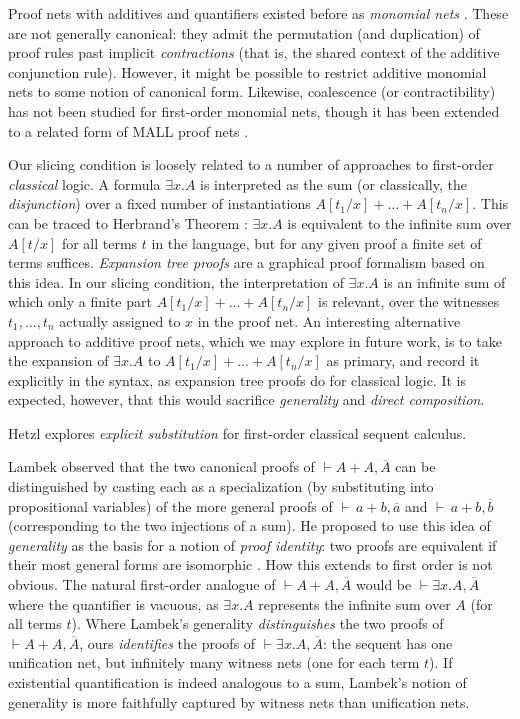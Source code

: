\documentclass[a4paper,UKenglish]{lipics-v2019}
\newcommand\+{+}
\renewcommand\*{\times}
\newcommand\dual[1]{\overline{#1}}
\newcommand\seq[2]{{\vdash}#1,#2}
\begin{document}
Proof nets with additives and quantifiers existed before as \emph{monomial nets} \cite{Girard-1996}. These are not generally canonical: they admit the permutation (and duplication) of proof rules past implicit \emph{contractions} (that is, the shared context of the additive conjunction rule). However, it might be possible to restrict additive monomial nets to some notion of canonical form. Likewise, coalescence (or contractibility) has not been studied for first-order monomial nets, though it has been extended to a related form of MALL proof nets \cite{Maieli-2007}.

Our slicing condition is loosely related to a number of approaches to first-order \emph{classical} logic. A formula $\exists x.A$ is interpreted as the sum (or classically, the \emph{disjunction}) over a fixed number of instantiations $A[t_1/x]\+\dots\+A[t_n/x]$. This can be traced to Herbrand's Theorem \cite{Herbrand-1930}: $\exists x.A$ is equivalent to the infinite sum over $A[t/x]$ for all terms $t$ in the language, but for any given proof a finite set of terms suffices. \emph{Expansion tree proofs} \cite{Miller-1987,Heijltjes-2010} are a graphical proof formalism based on this idea. In our slicing condition, the interpretation of $\exists x.A$ is an infinite sum of which only a finite part $A[t_1/x]\+\dots\+A[t_n/x]$ is relevant, over the witnesses $t_1,\dots,t_n$ actually assigned to $x$ in the proof net. An interesting alternative approach to additive proof nets, which we may explore in future work, is to take the expansion of $\exists x.A$ to $A[t_1/x]\+\dots\+A[t_n/x]$ as primary, and record it explicitly in the syntax, as expansion tree proofs do for classical logic. It is expected, however, that this would sacrifice \emph{generality} and \emph{direct composition}.

Hetzl \cite{Hetzl-2010} explores \emph{explicit substitution} for first-order classical sequent calculus.

Lambek observed that the two canonical proofs of $\seq{A{\+}A}{\dual A}$ can be distinguished by casting each as a specialization (by substituting into propositional variables) of the more general proofs of $\seq{\,a{\+}b}{\dual a}$ and $\seq{\,a{\+}b}{\dual b}$ (corresponding to the two injections of a sum). He proposed to use this idea of \emph{generality} as the basis for a notion of \emph{proof identity}: two proofs are equivalent if their most general forms are isomorphic \cite{Lambek-1968-1972}. How this extends to first order is not obvious. The natural first-order analogue of $\seq{A{\+}A}{\dual A}$ would be $\seq{\exists x.A}{\dual A}$ where the quantifier is vacuous, as $\exists x.A$ represents the infinite sum over $A$ (for all terms $t$). Where Lambek's generality \emph{distinguishes} the two proofs of $\seq{A{\+}A}{\dual A}$, ours \emph{identifies} the proofs of $\seq{\exists x.A}{\dual A}$: the sequent has one unification net, but infinitely many witness nets (one for each term $t$). If existential quantification is indeed analogous to a sum, Lambek's notion of generality is more faithfully captured by witness nets than unification nets.
\end{document}

